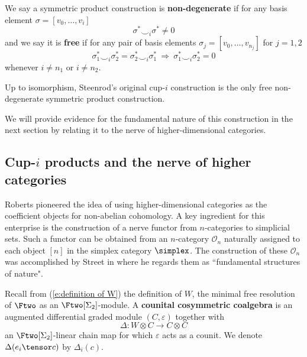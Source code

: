 We say a symmetric product construction is \textbf{non-degenerate} if for any basis element $\sigma = [v_0, \dots, v_i]$
\begin{equation*}
\boxed{\sigma^* \smallsmile_{i} \sigma^* \neq 0}
\end{equation*}
and we say it is \textbf{free} if for any pair of basis elements $\sigma_j = [v_0, \dots, v_{n_j}]$ for $j = 1, 2$
\begin{equation*}
\boxed{\sigma^*_1 \smallsmile_{i} \sigma^*_2 = \sigma^*_2 \smallsmile_{i} \sigma^*_1}\
\Longrightarrow\
\boxed{\sigma^*_1 \smallsmile_{i} \sigma^*_2 = 0}
\end{equation*}
whenever $i \neq n_1$ or $i \neq n_2$.

\begin{theorem} 
	Up to isomorphism, Steenrod's original cup-$i$ construction \cite{steenrod1947products} is the only free non-degenerate symmetric product construction.
\end{theorem}

We will provide evidence for the fundamental nature of this construction in the next section by relating it to the nerve of higher-dimensional categories.

\subsection{Cup-$i$ products and the nerve of higher categories}

Roberts \cite{roberts1977mathematical} pioneered the idea of using higher-dimensional categories as the coefficient objects for non-abelian cohomology.
A key ingredient for this enterprise is the construction of a nerve functor from \mbox{$n$-categories} to simplicial sets.
Such a functor can be obtained from an $n$-category $\mathcal{O}_n$ naturally assigned to each object $[n]$ in the simplex category $\simplex$.
The construction of these $\mathcal O_n$ was accomplished by Street in \cite{street1987orientals} where he regards them as ``fundamental structures of nature".

Recall from (\ref{e:definition of W}) the definition of $W$, the minimal free resolution of $\Ftwo$ as an $\Ftwo[\Sigma_2]$-module.
A \textbf{counital cosymmetric coalgebra} is an augmented differential graded module $(C, \varepsilon)$ together with
\begin{equation*}
\Delta \colon W \otimes C \to C \otimes C
\end{equation*}
an $\Ftwo[\Sigma_2]$-linear chain map for which $\varepsilon$ acts as a counit.
We denote $\Delta(e_i \tensor c)$ by $\Delta_i(c)$.

